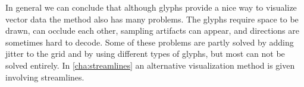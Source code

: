 In general we can conclude that although glyphs provide a nice way to visualize vector data the method also has many problems. The glyphs require space to be drawn, can occlude each other, sampling artifacts can appear, and directions are sometimes hard to decode. Some of these problems are partly solved by adding jitter to the grid and by using different types of glyphs, but most can not be solved entirely. In \cref{cha:streamlines} an alternative visualization method is given involving streamlines.


